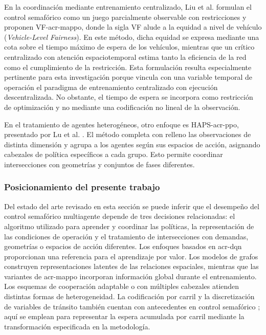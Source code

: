 En la coordinación mediante entrenamiento centralizado, Liu et al. \cite{liu2025vfmappo} formulan el control semafórico como un juego parcialmente observable con restricciones y proponen VF-\acrshort{acr-mappo}, donde la sigla VF alude a la equidad a nivel de vehículo (\textit{Vehicle-Level Fairness}). En este método, dicha equidad se expresa mediante una cota sobre el tiempo máximo de espera de los vehículos, mientras que un crítico centralizado con atención espaciotemporal estima tanto la eficiencia de la red como el cumplimiento de la restricción. Esta formulación resulta especialmente pertinente para esta investigación porque vincula con una variable temporal de operación el paradigma de entrenamiento centralizado con ejecución descentralizada. No obstante, el tiempo de espera se incorpora como restricción de optimización y no mediante una codificación no lineal de la observación.

En el tratamiento de agentes heterogéneos, otro enfoque es HAPS-\acrshort{acr-ppo}, presentado por Lu et al. \cite{lu2025hapsppo}. El método completa con relleno las observaciones de distinta dimensión y agrupa a los agentes según sus espacios de acción, asignando cabezales de política específicos a cada grupo. Esto permite coordinar intersecciones con geometrías y conjuntos de fases diferentes.

\subsubsection{Posicionamiento del presente trabajo}

Del estado del arte revisado en esta sección se puede inferir que el desempeño del control semafórico multiagente depende de tres decisiones relacionadas: el algoritmo utilizado para aprender y coordinar las políticas, la representación de las condiciones de operación y el tratamiento de intersecciones con demandas, geometrías o espacios de acción diferentes. Los enfoques basados en \acrshort{acr-dqn} proporcionan una referencia para el aprendizaje por valor. Los modelos de grafos construyen representaciones latentes de las relaciones espaciales, mientras que las variantes de \acrshort{acr-mappo} incorporan información global durante el entrenamiento. Los esquemas de cooperación adaptable o con múltiples cabezales atienden distintas formas de heterogeneidad. La codificación por carril y la discretización de variables de tránsito también cuentan con antecedentes en control semafórico \cite{genders2018representations}; aquí se emplean para representar la espera acumulada por carril mediante la transformación especificada en la metodología.


